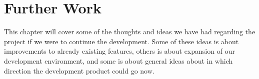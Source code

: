 
\chapter{Further Work}
\label{cha:future_work}

This chapter will cover some of the thoughts and ideas we have had regarding the project if we were to continue the development. Some of these ideas is about improvements to already existing features, others is about expansion of our development environment, and some is about general ideas about in which direction the development product could go now. 















